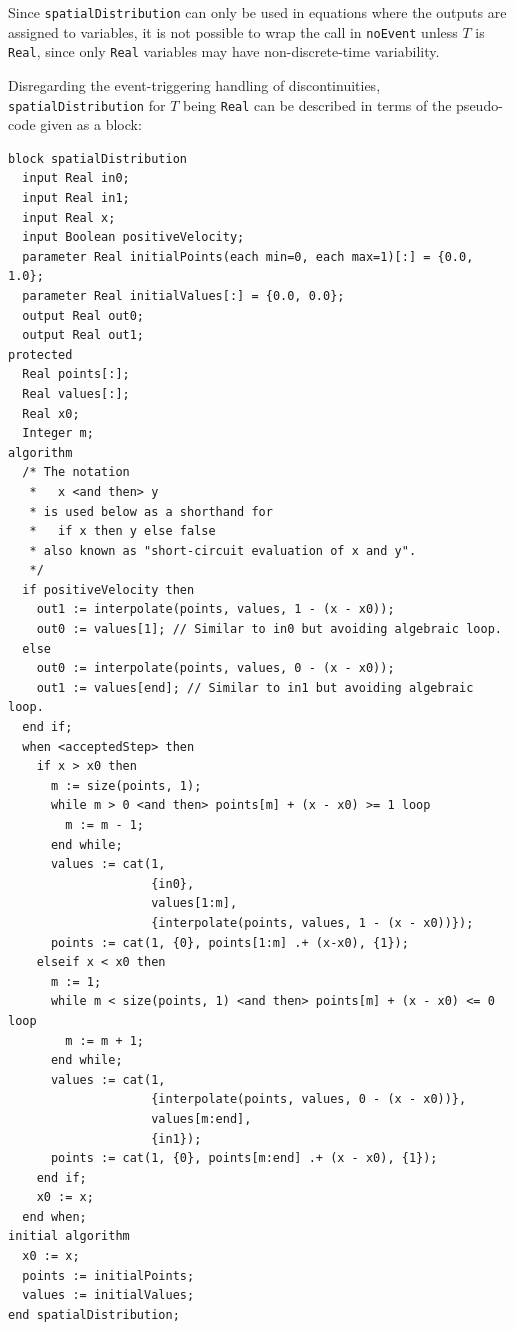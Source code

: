 \begin{nonnormative}
Since \lstinline!spatialDistribution! can only be used in equations where the outputs are assigned to variables, it is not possible to wrap the call in \lstinline!noEvent! unless $T$ is \lstinline!Real!, since only \lstinline!Real! variables may have non-discrete-time variability.
\end{nonnormative}

Disregarding the event-triggering handling of discontinuities, \lstinline!spatialDistribution! for $T$ being \lstinline!Real! can be described in terms of the pseudo-code given as a block:
\begin{lstlisting}[language=modelica]
block spatialDistribution
  input Real in0;
  input Real in1;
  input Real x;
  input Boolean positiveVelocity;
  parameter Real initialPoints(each min=0, each max=1)[:] = {0.0, 1.0};
  parameter Real initialValues[:] = {0.0, 0.0};
  output Real out0;
  output Real out1;
protected
  Real points[:];
  Real values[:];
  Real x0;
  Integer m;
algorithm
  /* The notation
   *   x <and then> y
   * is used below as a shorthand for
   *   if x then y else false
   * also known as "short-circuit evaluation of x and y".
   */
  if positiveVelocity then
    out1 := interpolate(points, values, 1 - (x - x0));
    out0 := values[1]; // Similar to in0 but avoiding algebraic loop.
  else
    out0 := interpolate(points, values, 0 - (x - x0));
    out1 := values[end]; // Similar to in1 but avoiding algebraic loop.
  end if;
  when <acceptedStep> then
    if x > x0 then
      m := size(points, 1);
      while m > 0 <and then> points[m] + (x - x0) >= 1 loop
        m := m - 1;
      end while;
      values := cat(1,
                    {in0},
                    values[1:m],
                    {interpolate(points, values, 1 - (x - x0))});
      points := cat(1, {0}, points[1:m] .+ (x-x0), {1});
    elseif x < x0 then
      m := 1;
      while m < size(points, 1) <and then> points[m] + (x - x0) <= 0 loop
        m := m + 1;
      end while;
      values := cat(1,
                    {interpolate(points, values, 0 - (x - x0))},
                    values[m:end],
                    {in1});
      points := cat(1, {0}, points[m:end] .+ (x - x0), {1});
    end if;
    x0 := x;
  end when;
initial algorithm
  x0 := x;
  points := initialPoints;
  values := initialValues;
end spatialDistribution;
\end{lstlisting}

